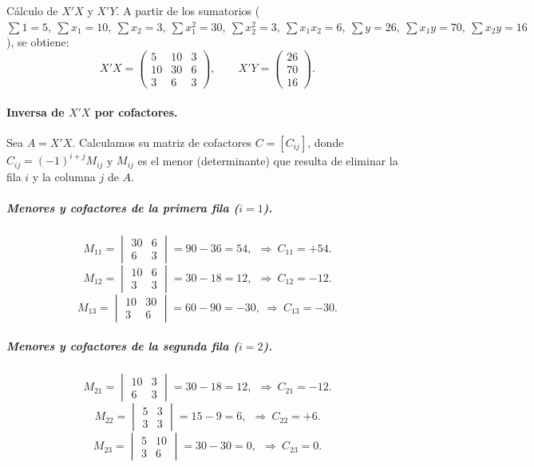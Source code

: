 \documentclass[11pt]{article}
\begin{document}
{\color{blue} Cálculo de \(X'X\) y \(X'Y\).
A partir de los sumatorios (\(\sum 1=5,\ \sum x_1=10,\ \sum x_2=3,\ \sum x_1^2=30,\ \sum x_2^2=3,\ \sum x_1x_2=6,\ \sum y=26,\ \sum x_1y=70,\ \sum x_2y=16\)), se obtiene:
\[
X'X=
\begin{pmatrix}
5&10&3\\
10&30&6\\
3&6&3
\end{pmatrix},
\qquad
X'Y=
\begin{pmatrix}
26\\ 70\\ 16
\end{pmatrix}.
\]

\paragraph{Inversa de \(X'X\) por cofactores.}
Sea \(A=X'X\). Calculamos su matriz de cofactores \(C=[C_{ij}]\), donde 
\(C_{ij}=(-1)^{i+j}M_{ij}\) y \(M_{ij}\) es el menor (determinante) que resulta de eliminar la fila \(i\) y la columna \(j\) de \(A\).

\subparagraph{Menores y cofactores de la primera fila (\(i=1\)).}
\[
M_{11}=\begin{vmatrix}30&6\\6&3\end{vmatrix}=90-36=54,\ \ \Rightarrow\ C_{11}=+54.
\]
\[
M_{12}=\begin{vmatrix}10&6\\3&3\end{vmatrix}=30-18=12,\ \ \Rightarrow\ C_{12}=-12.
\]
\[
M_{13}=\begin{vmatrix}10&30\\3&6\end{vmatrix}=60-90=-30,\ \Rightarrow\ C_{13}=-30.
\]

\subparagraph{Menores y cofactores de la segunda fila (\(i=2\)).}
\[
M_{21}=\begin{vmatrix}10&3\\6&3\end{vmatrix}=30-18=12,\ \ \Rightarrow\ C_{21}=-12.
\]
\[
M_{22}=\begin{vmatrix}5&3\\3&3\end{vmatrix}=15-9=6,\ \ \Rightarrow\ C_{22}=+6.
\]
\[
M_{23}=\begin{vmatrix}5&10\\3&6\end{vmatrix}=30-30=0,\ \ \Rightarrow\ C_{23}=0.
\]

}
\end{document}

